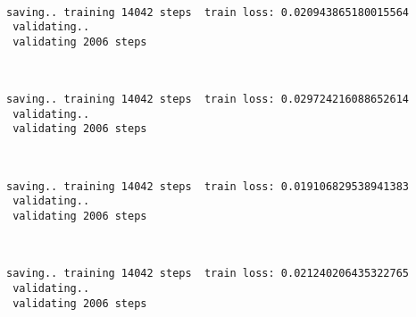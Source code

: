 \documentclass[11pt]{article}
\begin{document}
    \begin{center}
    \end{center}
    { \hspace*{\fill} \\}
    
    \begin{Verbatim}[commandchars=\\\{\}]
 saving.. training 14042 steps  train loss: 0.020943865180015564
 validating..
 validating 2006 steps
    \end{Verbatim}

    \begin{center}
    \end{center}
    { \hspace*{\fill} \\}
    
    \begin{Verbatim}[commandchars=\\\{\}]
 saving.. training 14042 steps  train loss: 0.029724216088652614
 validating..
 validating 2006 steps
    \end{Verbatim}

    \begin{center}
    \end{center}
    { \hspace*{\fill} \\}
    
    \begin{Verbatim}[commandchars=\\\{\}]
 saving.. training 14042 steps  train loss: 0.019106829538941383
 validating..
 validating 2006 steps
    \end{Verbatim}

    \begin{center}
    \end{center}
    { \hspace*{\fill} \\}
    
    \begin{Verbatim}[commandchars=\\\{\}]
 saving.. training 14042 steps  train loss: 0.021240206435322765
 validating..
 validating 2006 steps
    \end{Verbatim}
\end{document}

